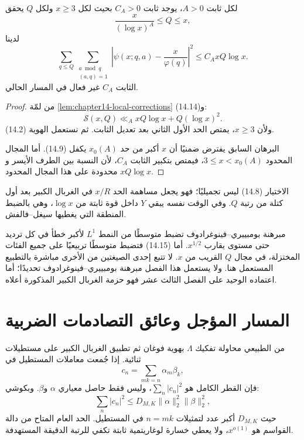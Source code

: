 \begin{theorem}
\label{thm:chapter14-bdh}
\provedhere
لكل ثابت \(A>0\)، يوجد ثابت \(C_A>0\) بحيث لكل \(x\ge3\) ولكل \(Q\) يحقق
\[
\frac{x}{(\log x)^A}\le Q\le x,
\]
لدينا
\[
\boxed{
\sum_{q\le Q}
\sum_{\substack{a\bmod q\\(a,q)=1}}
\left|\psi(x;q,a)-\frac{x}{\varphi(q)}\right|^2
\le
C_AxQ\log x
}.
\tag{14.15}
\]
الثابت \(C_A\) غير فعال في المسار الحالي.
\end{theorem}

\begin{proof}
من لمّة \ref{lem:chapter14-local-corrections} و(14.14):
\[
\mathcal S(x,Q)
\ll_A
xQ\log x+Q(\log x)^2.
\]
ولأن \(x\ge3\)، يمتص الحد الأول الثاني بعد تعديل الثابت. ثم نستعمل الهوية
(14.2).

البرهان السابق يفترض ضمنيًا أن \(x\) أكبر من حد \(x_0(A)\) يكفل (14.9).
أما المجال المحدود \(3\le x<x_0(A)\)، فيمتص بتكبير الثابت \(C_A\)، لأن
النسبة بين الطرف الأيسر و\(xQ\log x\) محدودة على هذا المجال المحدود.
\end{proof}

\begin{remark}
الاختيار (14.8) ليس تجميليًا؛ فهو يجعل مساهمة الحد \(x/R\) في الغربال الكبير
بعد أول كتلة من رتبة \(Q\). وفي الوقت نفسه يبقي \(Y\) داخل قوة ثابتة من
\(\log x\)، وهي بالضبط المنطقة التي يغطيها سيغل--فالفش.
\end{remark}

\begin{remark}
مبرهنة بومبييري--فينوغرادوف تضبط متوسطًا من النمط \(L^1\) لأكبر خطأ في كل
ترديد حتى مستوى يقارب \(x^{1/2}\). أما (14.15) فتضبط متوسطًا تربيعيًا على
جميع الفئات المختزلة، في مجال \(Q\) القريب من \(x\). لا تتبع إحدى الصيغتين
من الأخرى مباشرة بالتطبيع المستعمل هنا. ولا يستعمل هذا الفصل مبرهنة
بومبييري--فينوغرادوف تحديدًا؛ أما اعتماده الوحيد على الفصل الثالث عشر فهو
حزمة الغربال الكبير المذكورة أعلاه.
\end{remark}

\section{المسار المؤجل وعائق التصادمات الضربية}

من الطبيعي محاولة تفكيك \(\Lambda\) بهوية فوغان ثم تطبيق الغربال الكبير على
مستطيلات ثنائية. إذا جُمعت معاملات المستطيل في
\[
c_n=\sum_{mk=n}\alpha_m\beta_k,
\]
فإن القطر الكامل هو \(\sum_n|c_n|^2\)، وليس فقط حاصل معياري
\(\alpha\) و\(\beta\). وبكوشي:
\[
\sum_n|c_n|^2
\le
D_{M,K}\|\alpha\|_2^2\|\beta\|_2^2,
\]
حيث \(D_{M,K}\) أكبر عدد لتمثيلات \(n=mk\) في المستطيل. الحد العام المتاح
من دالة القواسم هو \(x^{o(1)}\)، ولا يعطي خسارة لوغاريتمية ثابتة تكفي للرتبة
الدقيقة المستهدفة.

